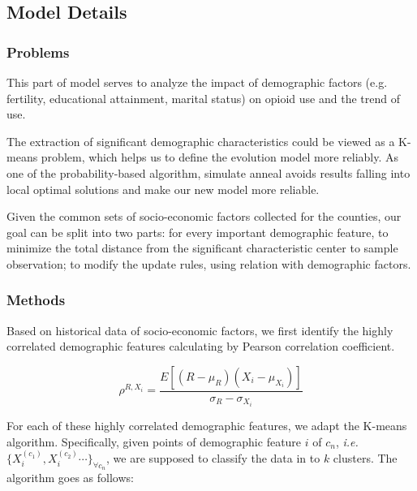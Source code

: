 \documentclass[a4paper]{article}
\begin{document}
\subsection{Model Details}\label{sec4.4}

\subsubsection*{Problems}

This part of model serves to analyze the impact of demographic factors (e.g. fertility, educational attainment, marital status) on opioid use and the trend of use. 

The extraction of significant demographic characteristics could be viewed as a K-means problem, which helps us to define the evolution model more reliably. As one of the probability-based algorithm, simulate anneal avoids results falling into local optimal solutions and make our new model more reliable. 

Given the common sets of socio-economic factors collected for the counties, our goal can be split into two parts: for every important demographic feature, to minimize the total distance from the significant characteristic center to sample observation; to modify the update rules, using relation with demographic factors.

\subsubsection*{Methods}

Based on historical data of socio-economic factors, we first identify the highly correlated demographic features calculating by Pearson correlation coefficient. 

\begin{equation}
    \rho^{R,X_i}=\frac{E[(R-\mu_{R})(X_i-\mu_{X_i})]}{\sigma_R-\sigma_{X_i}}
\end{equation}
\vspace{4pt}

For each of these highly correlated demographic features, we adapt the K-means algorithm. Specifically, given points of demographic feature $i$ of $c_n$, \textit{i.e.} $\{X_i^{(c_1)},X_i^{(c_2)}\cdots\}_{\forall c_n}$, we are supposed to classify the data in to $k$ clusters. The algorithm goes as follows:
\end{document}
